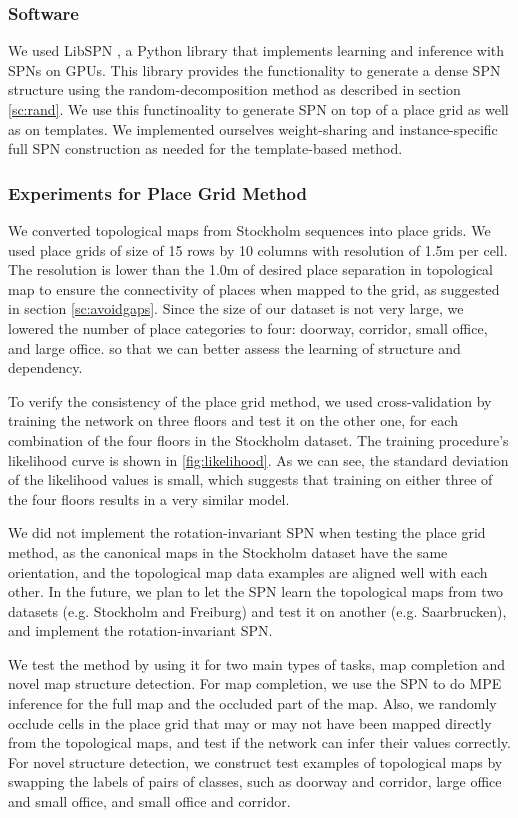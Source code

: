 \documentclass[10pt, titlepage]{article}
\theoremstyle{definition}
\begin{document}
\subsubsection{Software}
We used LibSPN \cite{pronobis2016learning}, a Python library that implements learning and inference with SPNs on GPUs. This library provides the functionality to generate a dense SPN structure using the random-decomposition method as described in section \ref{sc:rand}. We use this functinoality to generate SPN on top of a place grid as well as on templates. We implemented ourselves weight-sharing and instance-specific full SPN construction as needed for the template-based method. 

\subsubsection{Experiments for Place Grid Method}\label{section:exp-grid}

We converted topological maps from Stockholm sequences into place grids. We used place grids of size of 15 rows by 10 columns with resolution of 1.5m per cell. The resolution is lower than the 1.0m of desired place separation in topological map to ensure the connectivity of places when mapped to the grid, as suggested in section \ref{sc:avoidgaps}. Since the size of our dataset is not very large, we lowered the number of place categories to four: doorway, corridor, small office, and large office. so that we can better assess the learning of structure and dependency.


To verify the consistency of the place grid method,  we used cross-validation by training the network on three floors and test it on the other one, for each combination of the four floors in the Stockholm dataset. The training procedure's likelihood curve is shown in \ref{fig:likelihood}. As we can see, the standard deviation of the likelihood values is small, which suggests that training on either three of the four floors results in a very similar model.

We did not implement the rotation-invariant SPN when testing the place grid method, as the canonical maps in the Stockholm dataset have the same orientation, and the topological map data examples are aligned well with each other. In the future, we plan to let the SPN learn the topological maps from two datasets (e.g. Stockholm and Freiburg) and test it on another (e.g. Saarbrucken), and implement the rotation-invariant SPN.

We test the method by using it for two main types of tasks, map completion and novel map structure detection. For map completion, we use the SPN to do MPE inference for the full map and the occluded part of the map. Also, we randomly occlude cells in the place grid that may or may not have been mapped directly from the topological maps, and test if the network can infer their values correctly. For novel structure detection, we construct test examples of topological maps by swapping the labels of pairs of classes, such as doorway and corridor, large office and small office, and small office and corridor.
\end{document}
